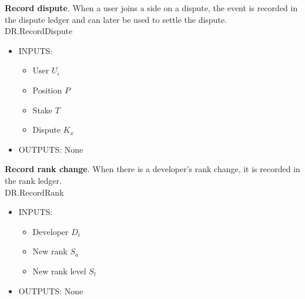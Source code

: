 \noindent \textbf{Record dispute}. When a user joins a side on a dispute, the event is recorded in the dispute ledger and can later be used to settle the dispute. \\

\textsf{DR.RecordDispute}
\begin{itemize}
	\item INPUTS:
	\begin{itemize}
		\item User $U_i$
		\item Position $P$
		\item Stake $T$
		\item Dispute $K_x$
	\end{itemize}
	\item OUTPUTS: None
\end{itemize}

\noindent \textbf{Record rank change}. When there is a developer's rank change, it is recorded in the rank ledger. \\

\textsf{DR.RecordRank}
\begin{itemize}
	\item INPUTS:
	\begin{itemize}
		\item Developer $D_i$
		\item New rank $S_a$
		\item New rank level $S_l$
	\end{itemize}
	\item OUTPUTS: None
\end{itemize}

